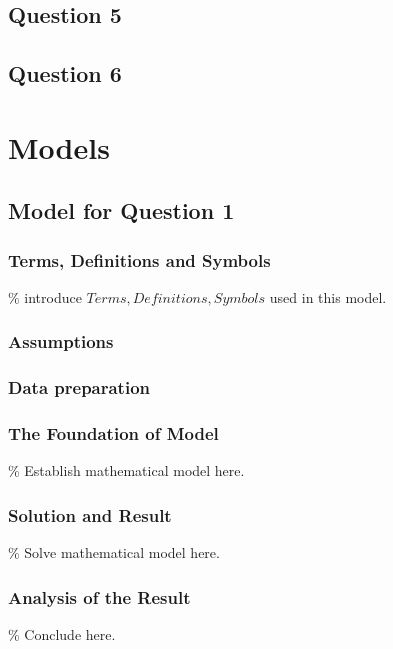 \documentclass{apmcmthesis}
\begin{document}
\subsection{Question 5}



\subsection{Question 6}




\section{Models}

\subsection{Model for Question 1}

\subsubsection{Terms, Definitions and Symbols}
\% introduce $Terms, Definitions, Symbols$ used in this model.



\subsubsection{Assumptions}


\subsubsection{Data preparation}


\subsubsection{The Foundation of Model}
\% Establish mathematical model here.


\subsubsection{Solution and Result}
\% Solve mathematical model here.


\subsubsection{Analysis of the Result}
\% Conclude here.
\end{document}
